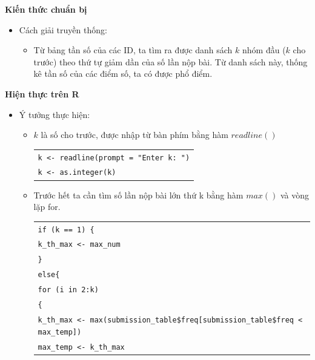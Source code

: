 \documentclass[a4paper]{article}
\theoremstyle{definition}
\begin{document}
\begin{enumerate}[a)]
    \bf Kiến thức chuẩn bị\normalfont
    \begin{itemize}
        \item Cách giải truyền thống:
        \begin{itemize}
            \item Từ bảng tần số của các ID, ta tìm ra được danh sách $k$ nhóm đầu ($k$ cho trước) theo thứ tự giảm dần của số lần nộp bài. Từ danh sách này, thống kê tần số của các điểm số, ta có được phổ điểm.
        \end{itemize}
    \end{itemize}
    \bf Hiện thực trên R\normalfont
    \begin{itemize}
        \item Ý tưởng thực hiện:
        \begin{itemize}
            \item $k$ là số cho trước, được nhập từ bàn phím bằng hàm $readline()$
            \begin{center}
                \begin{tabular}{p{13cm}}
                    \texttt{k <- readline(prompt = "Enter k: ")} \\
                    \texttt{k <- as.integer(k)}
                \end{tabular}
            \end{center}
            \item Trước hết ta cần tìm số lần nộp bài lớn thứ k bằng hàm $max()$ và vòng lặp for.
            \begin{center}
                \begin{tabular}{p{13cm}}
                    \texttt{if (k == 1) \{} \\
                    \hspace{0.5cm} \texttt{k\_th\_max <- max\_num} \\
                    \texttt{\}} \\
                    \texttt{else\{} \\
                    \hspace{0.5cm} \texttt{for (i in 2:k)} \\
                    \hspace{0.5cm} \texttt{\{} \\
                    \hspace{1cm} \texttt{k\_th\_max <- max(submission\_table\$freq[submission\_table\$freq < max\_temp])} \\
                    \hspace{1cm} \texttt{max\_temp <- k\_th\_max} \\

\end{tabular}
\end{center}
\end{itemize}
\end{itemize}
\end{enumerate}
\end{document}
